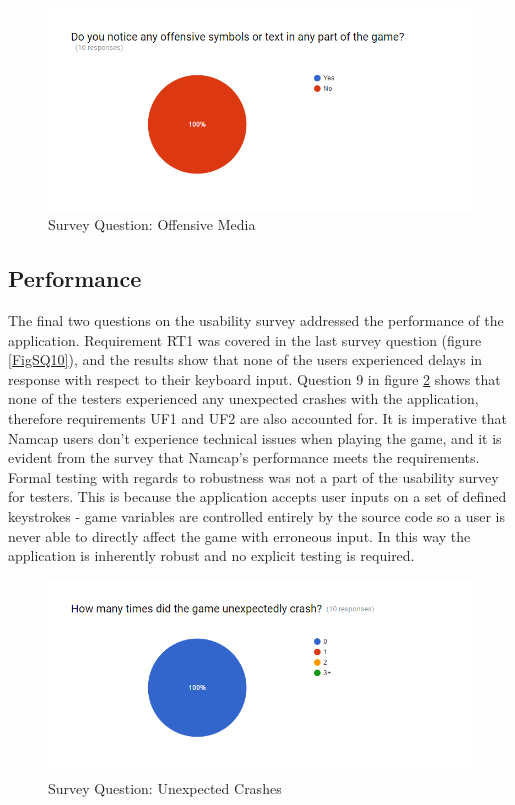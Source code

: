 \documentclass[12pt, titlepage]{article}
\begin{document}
\begin{figure}[H]
\centering
\includegraphics[width=1.0\textwidth]{SurveyQuestion8.png}
\caption{Survey Question: Offensive Media}
\label{FigSQ8}
\end{figure}
		
\subsection{Performance}

The final two questions on the usability survey addressed the performance of the application. Requirement RT1 was covered in the last survey question (figure \ref{FigSQ10}), and the results show that none of the users experienced delays in response with respect to their keyboard input. Question 9 in figure \ref{FigSQ9} shows that none of the testers experienced any unexpected crashes with the application, therefore requirements UF1 and UF2 are also accounted for. It is imperative that Namcap users don't experience technical issues when playing the game, and it is evident from the survey that Namcap's performance meets the requirements.\\

\noindent Formal testing with regards to robustness was not a part of the usability survey for testers. This is because the application accepts user inputs on a set of defined keystrokes - game variables are controlled entirely by the source code so a user is never able to directly affect the game with erroneous input. In this way the application is inherently robust and no explicit testing is required.

\begin{figure}[H]
\centering
\includegraphics[width=1.0\textwidth]{SurveyQuestion9.png}
\caption{Survey Question: Unexpected Crashes}
\label{FigSQ9}
\end{figure}
\end{document}
